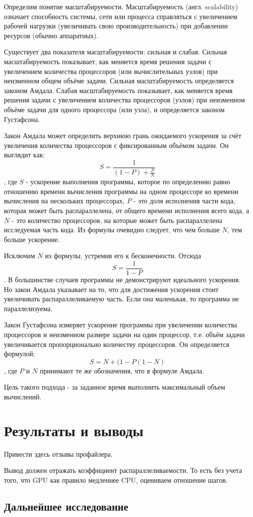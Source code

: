\documentclass[a4paper,14pt,russian]{extreport}
\begin{document}
Определим понятие масштабируемости. Масштабируемость (англ. scalability) означает способность системы, сети или процесса справляться с увеличением рабочей нагрузки (увеличивать свою производительность) при добавлении ресурсов (обычно аппаратных). 
\par Существует два показателя масштабируемости: сильная и слабая. Сильная масштабируемость показывает, как меняется время решения задачи с увеличением количества процессоров (или вычислительных узлов) при неизменном общем объёме задачи. Сильная масштабируемость определяется законом Амдала. Слабая масштабируемость показывает, как меняется время решения задачи с увеличением количества процессоров (узлов) при неизменном объёме задачи для одного процессора (или узла), и определяется законом Густафсона.
\par Закон Амдала может определить верхнюю грань ожидаемого ускорения за счёт увеличения количества процессоров с фиксированным объёмом задачи. Он выглядит как:
  $$S=\frac{1}{\left(1-P\right)+\frac{P}{N}}$$, где $S$ - ускорение выполнения программы, которое по определению равно отношению времени вычисления программы на одном процессоре ко времени вычисления на нескольких процессорах, $P$ - это доля исполнения части кода, которая может быть распараллелена, от общего времени исполнения всего кода, а $N$ - это количество процессоров, на которые может быть распараллелена исследуемая часть кода. Из формулы очевидно следует, что чем больше $N$, тем больше ускорение.
\par Исключим $N$ из формулы, устремив его к бесконечности. Отсюда $$S = \frac{1}{1-P}$$. В большинстве случаев программы не демонстрируют идеального ускорения. Но закон Амдала указывает на то, что для достижения ускорения стоит увеличивать распараллеливаемую часть. Если она маленькая, то программа не параллелизуема.
\par Закон Густафсона измеряет ускорение программы при увеличении количества процессоров и неизменном размере задачи на один процессор, т.е. объём задачи увеличивается пропорционально количеству процессоров. Он определяется формулой: $$S=N+(1-P(1-N)$$, где $P$ и $N$ принимают те же обозначения, что в формуле Амдала. 
\par Цель такого подхода - за заданное время выполнить максимальный объем вычислений.


\chapter{Результаты и выводы}

Привести здесь отзывы профайлера.
\par Вывод должен отражать коэффициент распараллеливаемости. То есть без учета того, что GPU как правило медленнее CPU, оцениваем отношение шагов. 


\section{Дальнейшее исследование}



 
\end{document}
